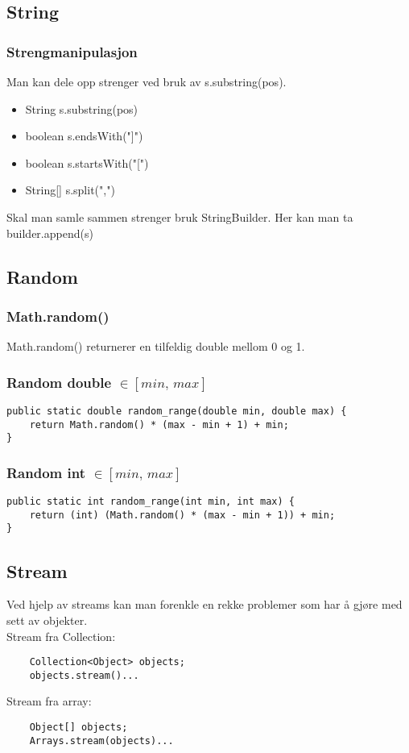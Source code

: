 \documentclass{article}
\begin{document}
\subsection{String}
\subsubsection{Strengmanipulasjon}
Man kan dele opp strenger ved bruk av s.substring(pos).

\begin{itemize}
    \item String s.substring(pos)
    \item boolean s.endsWith("]")
    \item boolean s.startsWith("[")
    \item String[] s.split(",")
\end{itemize}

Skal man samle sammen strenger bruk StringBuilder. Her kan man ta builder.append(s)


\subsection{Random}
\subsubsection{Math.random()}
Math.random() returnerer en tilfeldig double mellom 0 og 1.

\subsubsection{Random double $\in [min,\,max]$}
\begin{verbatim}
public static double random_range(double min, double max) {
    return Math.random() * (max - min + 1) + min;
}
\end{verbatim}
\subsubsection{Random int $\in [min,\,max]$}
\begin{verbatim}
public static int random_range(int min, int max) {
    return (int) (Math.random() * (max - min + 1)) + min;
}
\end{verbatim}



\subsection{Stream}
Ved hjelp av streams kan man forenkle en rekke problemer som har å gjøre med sett av objekter.\\
Stream fra Collection:
\begin{verbatim}
    Collection<Object> objects;
    objects.stream()...
\end{verbatim}
Stream fra array:
\begin{verbatim}
    Object[] objects;
    Arrays.stream(objects)...
\end{verbatim}
\end{document}
